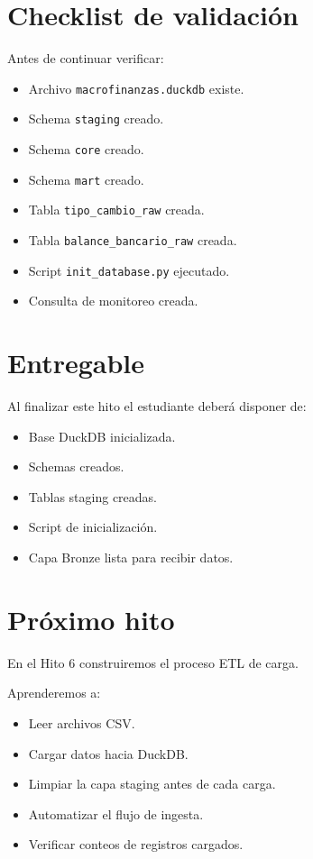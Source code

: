 \section{Checklist de validación}

Antes de continuar verificar:

\begin{itemize}
\item[$\Box$] Archivo \texttt{macrofinanzas.duckdb} existe.
\item[$\Box$] Schema \texttt{staging} creado.
\item[$\Box$] Schema \texttt{core} creado.
\item[$\Box$] Schema \texttt{mart} creado.
\item[$\Box$] Tabla \texttt{tipo_cambio_raw} creada.
\item[$\Box$] Tabla \texttt{balance_bancario_raw} creada.
\item[$\Box$] Script \texttt{init_database.py} ejecutado.
\item[$\Box$] Consulta de monitoreo creada.
\end{itemize}

\section{Entregable}

Al finalizar este hito el estudiante deberá disponer de:

\begin{itemize}
\item Base DuckDB inicializada.
\item Schemas creados.
\item Tablas staging creadas.
\item Script de inicialización.
\item Capa Bronze lista para recibir datos.
\end{itemize}

\section{Próximo hito}

En el Hito 6 construiremos el proceso ETL de carga.

Aprenderemos a:

\begin{itemize}
\item Leer archivos CSV.
\item Cargar datos hacia DuckDB.
\item Limpiar la capa staging antes de cada carga.
\item Automatizar el flujo de ingesta.
\item Verificar conteos de registros cargados.
\end{itemize}

